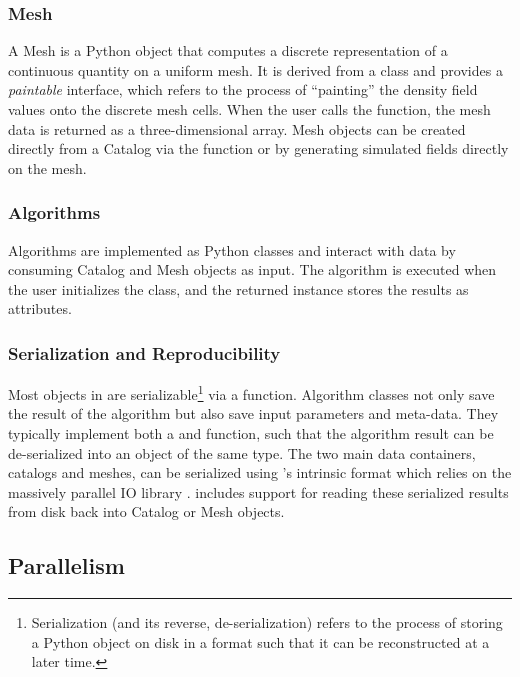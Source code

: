 \subsubsection{Mesh}

A Mesh is a Python object that computes a discrete representation
of a continuous quantity on a uniform mesh.  It is
derived from a  class and provides a
\textit{paintable} interface, which refers to the process of ``painting''
the density field values onto the discrete mesh cells. When the
user calls the  function, the
mesh data is returned as a three-dimensional array.
Mesh objects can be created directly from a Catalog via the 
function or by generating simulated fields directly on the mesh.

\subsubsection{Algorithms}

Algorithms are implemented as Python classes and interact with data
by consuming Catalog and Mesh objects as input. The algorithm is executed
when the user initializes the class, and the returned instance stores
the results as attributes.

\subsubsection{Serialization and Reproducibility}

Most objects in \nbkit{} are serializable\footnote{Serialization (and its reverse,
de-serialization) refers to the process of storing a Python object on disk
in a format such that it can be reconstructed at a later time.} via
a  function.
Algorithm classes not only save the result of the
algorithm but also save input parameters and meta-data.
They typically implement both a  and  function, such
that the algorithm result can be de-serialized into an object of the same type.
The two main data containers, catalogs and meshes, can be serialized using
\nbkit{}'s intrinsic format which relies on the massively parallel IO
library \bigfile{} \citep{bigfile}. \nbkit{} includes support for reading
these serialized results from disk back into Catalog or Mesh objects.

\subsection{Parallelism}


